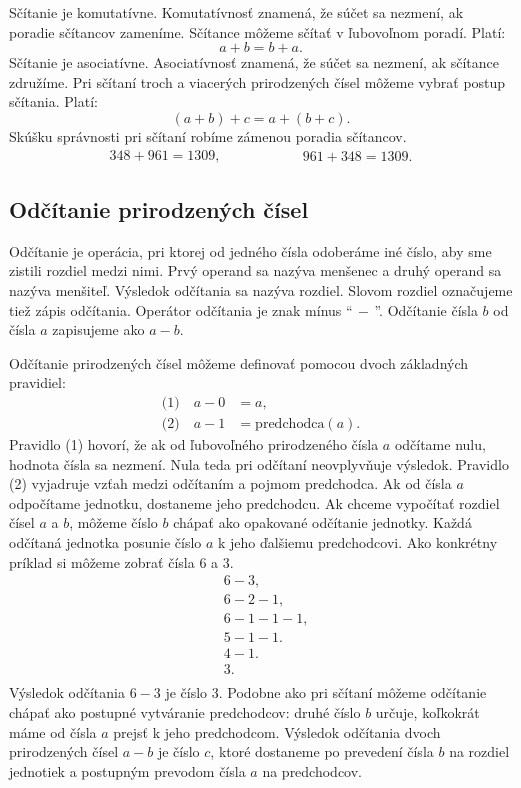 \documentclass{article}
\begin{document}
Sčítanie je komutatívne. Komutatívnosť znamená, že súčet sa nezmení, ak poradie sčítancov zameníme. Sčítance môžeme sčítať v ľubovoľnom poradí. Platí:
\[
a + b = b + a.
\]
Sčítanie je asociatívne. Asociatívnosť znamená, že súčet sa nezmení, ak sčítance združíme. Pri sčítaní troch a viacerých prirodzených čísel môžeme vybrať postup sčítania. Platí:
\[
(a + b) + c = a + (b + c).
\]
Skúšku správnosti pri sčítaní robíme zámenou poradia sčítancov.
\[
\begin{aligned}
  348 + 961 = 1309,
\end{aligned}
\hspace{5em}
\begin{aligned}
  961 + 348 = 1309.
\end{aligned}
\]

\subsection{Odčítanie prirodzených čísel}

Odčítanie je operácia, pri ktorej od jedného čísla odoberáme iné číslo, aby sme zistili rozdiel medzi nimi. Prvý operand sa nazýva menšenec a druhý operand sa nazýva menšiteľ. Výsledok odčítania sa nazýva rozdiel. Slovom rozdiel označujeme tiež zápis odčítania. Operátor odčítania je znak mínus \enquote{\(\, - \,\)}. Odčítanie čísla \(b\) od čísla \(a\) zapisujeme ako \(a - b\).

Odčítanie prirodzených čísel môžeme definovať pomocou dvoch základných pravidiel:
\[
\begin{aligned}
  \text{(1)}\quad a - 0 &= a, \\
  \text{(2)}\quad a - 1 &= \text{predchodca}(a).
\end{aligned}
\]
Pravidlo (1) hovorí, že ak od ľubovoľného prirodzeného čísla \(a\) odčítame nulu, hodnota čísla sa nezmení. Nula teda pri odčítaní neovplyvňuje výsledok. Pravidlo (2) vyjadruje vzťah medzi odčítaním a pojmom predchodca. Ak od čísla \(a\) odpočítame jednotku, dostaneme jeho predchodcu. Ak chceme vypočítať rozdiel čísel \(a\) a \(b\), môžeme číslo \(b\) chápať ako opakované odčítanie jednotky. Každá odčítaná jednotka posunie číslo \(a\) k jeho ďalšiemu predchodcovi. Ako konkrétny príklad si môžeme zobrať čísla \(6\) a \(3\).
\[
\begin{aligned}
  &6 - 3, \\
  &6 - 2 - 1, \\
  &6 - 1 - 1 - 1, \\
  &5 - 1 - 1. \\
  &4 - 1. \\
  &3. \\
\end{aligned}
\]
Výsledok odčítania \(6 - 3\) je číslo \(3\). Podobne ako pri sčítaní môžeme odčítanie chápať ako postupné vytváranie predchodcov: druhé číslo \(b\) určuje, koľkokrát máme od čísla \(a\) prejsť k jeho predchodcom. Výsledok odčítania dvoch prirodzených čísel \(a - b\) je číslo \(c\), ktoré dostaneme po prevedení čísla \(b\) na rozdiel jednotiek a postupným prevodom čísla \(a\) na predchodcov.
\end{document}
